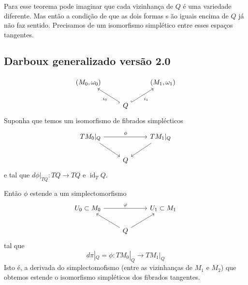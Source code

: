 Para esse teorema pode imaginar que cada vizinhança de $Q$ \'e uma variedade diferente. Mas ent\~ao a condi\c c\~ao de que as dois formas s \~ao iguais encima de $Q$ j\'a n\~ao faz sentido. Precisamos de um isomorfismo simpl\'etico entre esses espaços tangentes.

\subsection{Darboux generalizado vers\~ao 2.0}

\begin{thm}\leavevmode
	\[\begin{tikzcd}
		(M_0,\omega_0)&&(M_1,\omega_1)\\
	&Q\arrow[ul,"i_0",hook]\arrow[ur,"i_1",hook,swap]
	\end{tikzcd}\]
	Suponha que temos um isomorfismo de fibrados simpl\'ecticos
	\[\begin{tikzcd}
	TM_0|_{Q}\arrow[rr,"\phi"]\arrow[dr,swap]&&TM_1|_{Q}\arrow[dl]\\
	&Q
	\end{tikzcd}\]
	e tal que $d\phi|_{TQ}:TQ\to TQ$ e $\operatorname{id}_TQ$.

	Ent\~ao $\phi$ estende a um simplectomorfismo
	\[\begin{tikzcd}
	U_0\subset M_0\arrow[rr,"\varphi"]&&U_1\subset M_1\\
	&Q\arrow[ul]\arrow[ur,swap]
	\end{tikzcd}\]
	tal que
	\[d\pi|_{Q}=\phi:TM_0|_{Q}\to TM_1|_{Q}\]
	Isto \'e, a derivada do simplectomofismo (entre as vizinhanças de $M_1$ e $M_2$) que obtemos estende o isomorfismo simpl\'eticos dos fibrados tangentes.
\end{thm}

